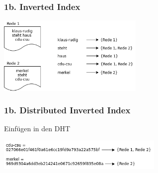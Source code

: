 \documentclass{beamer}
\begin{document}
\begin{frame}
  \frametitle{1b. Inverted Index}

  \includegraphics[width=7cm]{inverted-index}
\end{frame}

\begin{frame}
  \frametitle{1b. Distributed Inverted Index}

  Einfügen in den DHT

  \medskip

  \includegraphics[width=8cm]{distributed-inverted-index}
\end{frame}
\end{document}
